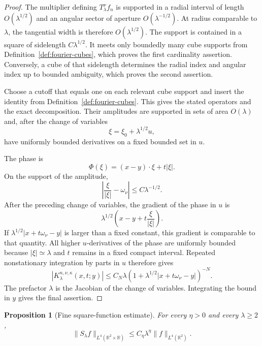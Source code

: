 \documentclass[11pt]{article}
\numberwithin{equation}{section}
\newtheorem{proposition}[theorem]{Proposition}
\theoremstyle{definition}
\theoremstyle{remark}
\newcommand{\R}{\mathbb R}
\begin{document}
\begin{proof}
The multiplier defining $T_\lambda^\nu f_n$ is supported in a radial interval of length $O(\lambda^{1/2})$ and an angular sector of aperture $O(\lambda^{-1/2})$.  At radius comparable to $\lambda$, the tangential width is therefore $O(\lambda^{1/2})$.  The support is contained in a square of sidelength $C\lambda^{1/2}$.  It meets only boundedly many cube supports from Definition~\ref{def:fourier-cubes}, which proves the first cardinality assertion.  Conversely, a cube of that sidelength determines the radial index and angular index up to bounded ambiguity, which proves the second assertion.

Choose a cutoff that equals one on each relevant cube support and insert the identity from Definition~\ref{def:fourier-cubes}.  This gives the stated operators and the exact decomposition.  Their amplitudes are supported in sets of area $O(\lambda)$ and, after the change of variables
\[
\xi=\xi_0+\lambda^{1/2}u,
\]
have uniformly bounded derivatives on a fixed bounded set in $u$.

The phase is
\[
\Phi(\xi)=(x-y)\cdot\xi+t|\xi|.
\]
On the support of the amplitude,
\[
\left|\frac\xi{|\xi|}-\omega_\nu\right|\le C\lambda^{-1/2}.
\]
After the preceding change of variables, the gradient of the phase in $u$ is
\[
\lambda^{1/2}\left(x-y+t\frac\xi{|\xi|}\right).
\]
If $\lambda^{1/2}|x+t\omega_\nu-y|$ is larger than a fixed constant, this gradient is comparable to that quantity.  All higher $u$-derivatives of the phase are uniformly bounded because $|\xi|\simeq\lambda$ and $t$ remains in a fixed compact interval.  Repeated nonstationary integration by parts in $u$ therefore gives
\[
|K_\lambda^{n,\nu,\kappa}(x,t;y)|
\le C_N\lambda(1+\lambda^{1/2}|x+t\omega_\nu-y|)^{-N}.
\]
The prefactor $\lambda$ is the Jacobian of the change of variables.  Integrating the bound in $y$ gives the final assertion.
\end{proof}

\begin{proposition}[Fine square-function estimate]\label{prop:mss-fine-square-function}
For every $\eta>0$ and every $\lambda\ge2$,
\[
\|S_\lambda f\|_{L^4(\R^2\times\R)}
\le C_\eta\lambda^\eta\|f\|_{L^4(\R^2)}.
\]
\end{proposition}
\end{document}
